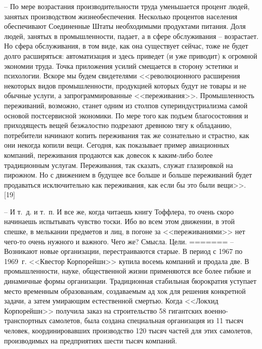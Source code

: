 \documentclass{book}
\begin{document}
{-- По мере возрастания производительности труда уменьша­ется процент людей, занятых производством жизнеобеспечения. Несколько процентов населения обеспечивают Соединен­ные Штаты необходимыми продуктами питания. Доля людей, занятых в промышленности, падает, а в сфере обслуживания -- возрастает. Но сфера обслуживания, в том виде, как она су­ществует сейчас, тоже не будет долго расширяться: автомати­зация и здесь приведет (и уже приводит) к огромной экономии труда. Точка приложения усилий смещается в сторону эстетики и психологии. Вскоре мы будем свидетелями <<революционного расширения некоторых видов промышленности, продукцией которых будут не товары и не обычные услуги, а запрограммированные <<переживания>>. Промышленность переживаний, возможно, станет одним из столпов супериндустриализма самой основой постсервисной экономики. По мере того как подъем благосостояния и приходящесть вещей безжалостно подрезают древнюю тягу к обладанию, потребители начинают копить переживания так же сознательно и страстно, как они некогда копили вещи. Сегодня, как показывает пример авиаци­онных компаний, переживания продаются как довесок к каким‑либо более традиционным услугам. Переживания, так сказать, служат глазировкой на пирожном. Но с движением в будущее все больше и больше переживаний будет продаваться исклю­чительно как переживания, как если бы это были вещи>>. [19]

-- И т.~д. и т.~п.
И все же, когда читаешь книгу Тоффлера, то очень скоро начинаешь испытывать чувство тоски. Ибо во всем этом движе­нии, в этой спешке, в мелькании предметов и лиц, в погоне за <<переживаниями>> нет чего‑то очень нужного и важного. Чего же? Смысла. Цели.
=======
-- Возникают новые организации, перестраиваются старые. В период с 1967 по 1969~г. <<Квестор Корпорейшн>> купила восемь компаний и продала две. В промышленности, науке, общественной жизни применяются все более гибкие и динамичные формы организации. Традиционная стабильная бюрократия уступает место временным образованьям, создаваемым ад хок для решения конкретной задачи, а затем умирающим естественной смертью. Когда <<Локхид Корпорейшн>> получила заказ на строительство 58 гигантских военно-транспортных самолетов, была создана специальная организация из 11 тысяч человек, координировавших производство 120 тысяч частей для этих самолетов, производимых на предприятиях шести тысяч компаний.

}
\end{document}
